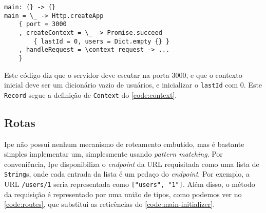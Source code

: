 \begin{lstlisting}[label={code:main-initializer},caption={Configuração inicial da aplicação}]
main: {} -> {}
main = \_ -> Http.createApp
    { port = 3000
    , createContext = \_ -> Promise.succeed
        { lastId = 0, users = Dict.empty {} }
    , handleRequest = \context request -> ...
    }
\end{lstlisting}

Este código diz que o servidor deve escutar na porta 3000, e que o contexto inicial deve ser um
dicionário vazio de usuários, e inicializar o \texttt{lastId} com 0. Este \texttt{Record} segue a
definição de \texttt{Context} do \autoref{code:context}.

\subsection{Rotas}\label{sec:routes}

Ipe não possui nenhum mecanismo de roteamento embutido, mas é bastante simples implementar um,
simplesmente usando \textit{pattern matching}. Por conveniência, Ipe disponibiliza o \textit{endpoint}
da URL requisitada como uma lista de \texttt{String}s, onde cada entrada da lista é um pedaço do
\textit{endpoint}. Por exemplo, a URL \texttt{/users/1} seria representada como \texttt{["users", "1"]}.
Além disso, o método da requisição é representado por uma união de tipos, como podemos ver no
\autoref{code:routes}, que substitui as reticências do \autoref{code:main-initializer}.

